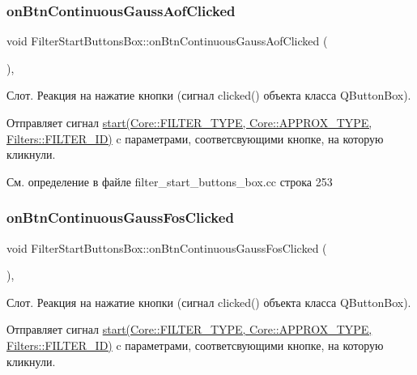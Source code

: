\subsubsection{\texorpdfstring{on\+Btn\+Continuous\+Gauss\+Aof\+Clicked}{onBtnContinuousGaussAofClicked}}
{\footnotesize\ttfamily void Filter\+Start\+Buttons\+Box\+::on\+Btn\+Continuous\+Gauss\+Aof\+Clicked (\begin{DoxyParamCaption}{ }\end{DoxyParamCaption})\hspace{0.3cm}{\ttfamily [private]}, {\ttfamily [slot]}}

Слот. Реакция на нажатие кнопки (сигнал clicked() объекта класса Q\+Button\+Box).

Отправляет сигнал \hyperlink{class_filter_start_buttons_box_ac6e2a6555f1d388391f188f834b8e753}{start(\+Core\+::\+F\+I\+L\+T\+E\+R\+\_\+\+T\+Y\+P\+E, Core\+::\+A\+P\+P\+R\+O\+X\+\_\+\+T\+Y\+P\+E, Filters\+::\+F\+I\+L\+T\+E\+R\+\_\+\+I\+D)} c параметрами, соответсвующими кнопке, на которую кликнули. 

См. определение в файле filter\+\_\+start\+\_\+buttons\+\_\+box.\+cc строка 253

\hypertarget{class_filter_start_buttons_box_a357e28766d55a027f4bf29f9f7e6e288}{}\label{class_filter_start_buttons_box_a357e28766d55a027f4bf29f9f7e6e288} 
\subsubsection{\texorpdfstring{on\+Btn\+Continuous\+Gauss\+Fos\+Clicked}{onBtnContinuousGaussFosClicked}}
{\footnotesize\ttfamily void Filter\+Start\+Buttons\+Box\+::on\+Btn\+Continuous\+Gauss\+Fos\+Clicked (\begin{DoxyParamCaption}{ }\end{DoxyParamCaption})\hspace{0.3cm}{\ttfamily [private]}, {\ttfamily [slot]}}

Слот. Реакция на нажатие кнопки (сигнал clicked() объекта класса Q\+Button\+Box).

Отправляет сигнал \hyperlink{class_filter_start_buttons_box_ac6e2a6555f1d388391f188f834b8e753}{start(\+Core\+::\+F\+I\+L\+T\+E\+R\+\_\+\+T\+Y\+P\+E, Core\+::\+A\+P\+P\+R\+O\+X\+\_\+\+T\+Y\+P\+E, Filters\+::\+F\+I\+L\+T\+E\+R\+\_\+\+I\+D)} c параметрами, соответсвующими кнопке, на которую кликнули. 

